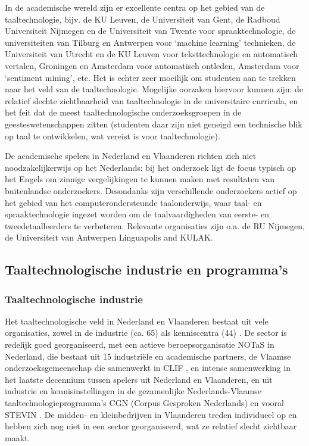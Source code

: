 \begin{multicols}{2}
    In de academische wereld zijn er excellente centra op het gebied van de taaltechnologie, bijv. de KU Leuven, de Universiteit van Gent, de Radboud Universiteit Nijmegen en de Universiteit van Twente voor spraaktechnologie, de universiteiten van Tilburg en Antwerpen voor `machine learning' technieken, de Universiteit van Utrecht en de KU Leuven voor teksttechnologie en automatisch vertalen, Groningen en Amsterdam voor automatisch ontleden, Amsterdam voor `sentiment mining', etc. Het is echter zeer moeilijk om studenten aan te trekken naar het veld van de taaltechnologie. Mogelijke oorzaken hiervoor kunnen zijn: de relatief slechte zichtbaarheid van taaltechnologie in de universitaire curricula, en het feit dat de meest taaltechnologische onderzoeksgroepen in de geesteswetenschappen zitten (studenten daar zijn niet geneigd een technische blik op taal te ontwikkelen, wat vereist is voor taaltechnologie).

    De academische spelers in Nederland en Vlaanderen richten zich niet noodzakelijkerwijs op het Nederlands: bij het onderzoek ligt de focus typisch op het Engels om zinnige vergelijkingen te kunnen maken met resultaten van buitenlandse onderzoekers. Desondanks zijn verschillende onderzoekers actief op het gebied van het computerondersteunde taalonderwijs, waar taal- en spraaktechnologie ingezet worden om de taalvaardigheden van eerste- en tweedetaalleerders te verbeteren. Relevante organisaties zijn o.a. de RU Nijmegen, de Universiteit van Antwerpen Linguapolis and KULAK.

 \subsection{Taaltechnologische industrie en programma's}

\subsubsection{Taaltechnologische industrie}

 Het taaltechnologische veld in Nederland en Vlaanderen bestaat uit vele organisaties, zowel in de industrie (ca. 65) als kenniscentra (44) \cite{Orgs}.  De sector is redelijk goed georganiseerd, met een actieve beroepsorganisatie NOTaS \cite{NOTAS} in Nederland, die bestaat uit 15 industri{\"e}le en academische partners, de Vlaamse onderzoeksgemeenschap die samenwerkt in CLIF \cite{CLIF}, en intense samenwerking in het laatste decennium tussen spelers uit Nederland en Vlaanderen, en uit industrie en kennisinstellingen in de gezamenlijke Nederlands-Vlaamse taaltechnologieprogramma's CGN (Corpus Gesproken Nederlands) \cite{CGN} en vooral STEVIN \cite{STEVIN}. De midden- en kleinbedrijven in Vlaanderen treden individueel op en hebben zich nog niet in een sector georganiseerd, wat ze relatief slecht zichtbaar maakt.


\end{multicols}
